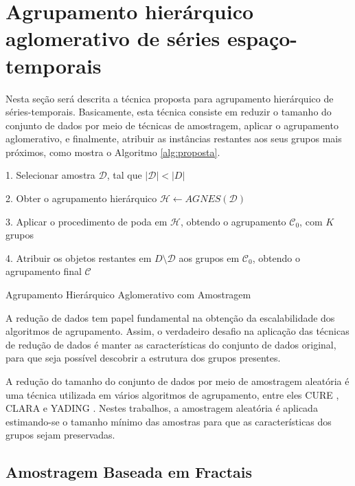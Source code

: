 \section{Agrupamento hierárquico aglomerativo de séries espaço-temporais}
	\label{sec:agrupamento_hierarquico}

Nesta seção será descrita a técnica proposta para agrupamento hierárquico de
séries-temporais. Basicamente, esta técnica consiste em reduzir o tamanho do
conjunto de dados por meio de técnicas de amostragem, aplicar o agrupamento
aglomerativo, e finalmente, atribuir as instâncias restantes aos seus grupos
mais próximos, como mostra o Algoritmo \ref{alg:proposta}.

\begin{algorithm}
	1. Selecionar amostra $\mathcal{D}$,
		tal que $\left|\mathcal{D}\right| < \left|D\right|$ \;
		
	2. Obter o agrupamento hierárquico
		$\mathcal{H} \gets AGNES\left(\mathcal{D}\right)$ \;
		
	3. Aplicar o procedimento de poda em $\mathcal{H}$, obtendo
		o agrupamento $\mathcal{C}_0$, com $K$ grupos \;
		
	4. Atribuir os objetos restantes em $D \setminus \mathcal{D}$
		aos grupos em $\mathcal{C}_0$, obtendo o agrupamento final $\mathcal{C}$ \;
	
	\caption{Agrupamento Hierárquico Aglomerativo com Amostragem}
	\label{alg:proposta}
\end{algorithm}

A redução de dados tem papel fundamental na obtenção da escalabilidade dos
algoritmos de agrupamento. Assim, o verdadeiro desafio na aplicação das técnicas
de redução de dados é manter as características do conjunto de dados original,
para que seja possível descobrir a estrutura dos grupos presentes.

A redução do tamanho do conjunto de dados por meio de amostragem aleatória é uma
técnica utilizada em vários algoritmos de agrupamento, entre eles CURE
\cite{guha1998cure}, CLARA \cite{kaufman1990finding} e YADING \cite{Ding2015}.
Nestes trabalhos, a amostragem aleatória é aplicada estimando-se o tamanho
mínimo das amostras para que as características dos grupos sejam preservadas.

\subsection{Amostragem Baseada em Fractais}
	\label{subsec:reducao_fractais}

